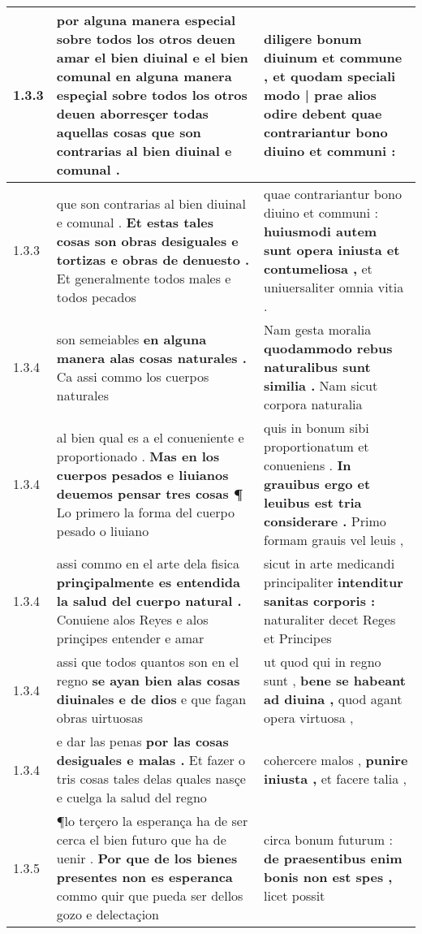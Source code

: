 \begin{tabular}{|p{1cm}|p{6.5cm}|p{6.5cm}|}
1.3.3 & por alguna manera especial sobre todos los otros deuen amar el bien diuinal \textbf{ e el bien comunal en alguna manera espeçial sobre todos los otros deuen aborresçer todas aquellas cosas } que son contrarias al bien diuinal e comunal . & diligere bonum diuinum et commune , \textbf{ et quodam speciali modo | prae alios odire debent } quae contrariantur bono diuino et communi : \\\hline
1.3.3 & que son contrarias al bien diuinal e comunal . \textbf{ Et estas tales cosas son obras desiguales e tortizas e obras de denuesto . } Et generalmente todos males e todos pecados & quae contrariantur bono diuino et communi : \textbf{ huiusmodi autem sunt opera iniusta et contumeliosa , } et uniuersaliter omnia vitia . \\\hline
1.3.4 & son semeiables \textbf{ en alguna manera alas cosas naturales . } Ca assi commo los cuerpos naturales & Nam gesta moralia \textbf{ quodammodo rebus naturalibus sunt similia . } Nam sicut corpora naturalia \\\hline
1.3.4 & al bien qual es a el conueniente e proportionado . \textbf{ Mas en los cuerpos pesados e liuianos deuemos pensar tres cosas ¶ } Lo primero la forma del cuerpo pesado o liuiano & quis in bonum sibi proportionatum et conueniens . \textbf{ In grauibus ergo et leuibus est tria considerare . } Primo formam grauis vel leuis , \\\hline
1.3.4 & assi commo en el arte dela fisica \textbf{ prinçipalmente es entendida la salud del cuerpo natural . } Conuiene alos Reyes e alos prinçipes entender e amar & sicut in arte medicandi principaliter \textbf{ intenditur sanitas corporis : } naturaliter decet Reges et Principes \\\hline
1.3.4 & assi que todos quantos son en el regno \textbf{ se ayan bien alas cosas diuinales e de dios } e que fagan obras uirtuosas & ut quod qui in regno sunt , \textbf{ bene se habeant ad diuina , } quod agant opera virtuosa , \\\hline
1.3.4 & e dar las penas \textbf{ por las cosas desiguales e malas . } Et fazer o tris cosas tales delas quales nasçe e cuelga la salud del regno & cohercere malos , \textbf{ punire iniusta , } et facere talia , \\\hline
1.3.5 & ¶lo terçero la esperança ha de ser cerca el bien futuro que ha de uenir . \textbf{ Por que de los bienes presentes non es esperanca } commo quir que pueda ser dellos gozo e delectaçion & circa bonum futurum : \textbf{ de praesentibus enim bonis non est spes , } licet possit \\\hline

\end{tabular}
